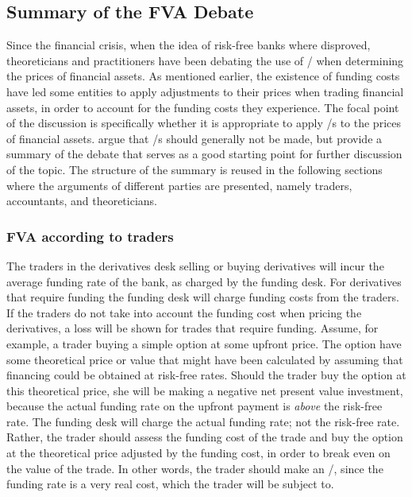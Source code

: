 \documentclass[../../../main.tex]{subfiles}
\begin{document}
    \subsection{Summary of the FVA Debate}
        Since the financial crisis, when the idea of risk-free banks where disproved,
        theoreticians and practitioners have been debating the use of \FVA/
        when determining the prices of financial assets.
        As mentioned earlier, the existence of funding costs have led some entities 
        to apply adjustments to their prices when trading financial assets, 
        in order to account for the funding costs they experience.
        The focal point of the discussion is specifically 
        whether it is appropriate to apply \FVA/s to the prices of financial assets.
        \textcite{HullWhiteFVA} argue that \FVA/s should generally not be made,
        but provide a summary of the debate that serves as a good starting point for further discussion of the topic.
        The structure of the summary is reused in the following sections
        where the arguments of different parties are presented,
        namely traders, accountants, and theoreticians.

        \subsubsection{FVA according to traders}
            The traders in the derivatives desk selling or buying derivatives 
            will incur the average funding rate of the bank, as charged by the funding desk.
            For derivatives that require funding the funding desk will charge funding costs from the traders.
            If the traders do not take into account the funding cost when pricing the derivatives,
            a loss will be shown for trades that require funding.
            Assume, for example, a trader buying a simple option at some upfront price.
            The option have some theoretical price or value that might have been calculated by assuming
            that financing could be obtained at risk-free rates. 
            Should the trader buy the option at this theoretical price, 
            she will be making a negative net present value investment, 
            because the actual funding rate on the upfront payment is \textit{above} the risk-free rate. 
            The funding desk will charge the actual funding rate; not the risk-free rate.
            Rather, the trader should assess the funding cost of the trade 
            and buy the option at the theoretical price adjusted by the funding cost,
            in order to break even on the value of the trade.
            In other words, the trader should make an \FVA/, 
            since the funding rate is a very real cost, which the trader will be subject to.
            
\end{document}
